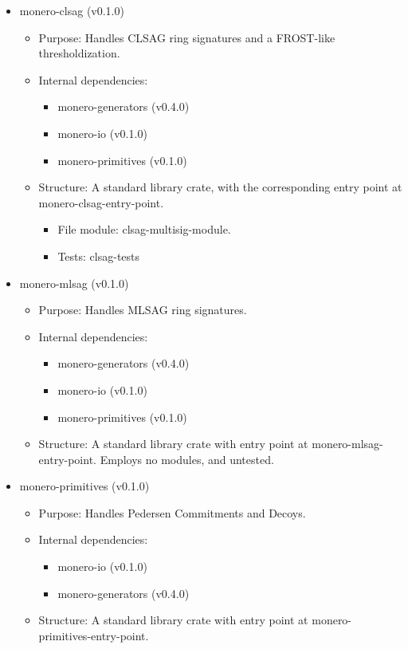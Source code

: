 \documentclass[12pt,a4paper]{article}
\begin{document}
\begin{itemize}
   \item \gls{monero-clsag (v0.1.0)}
   \begin{itemize}
   \item Purpose: Handles CLSAG ring signatures and a FROST-like thresholdization.
   \item Internal dependencies:
   \begin{itemize}
   \item \gls{monero-generators (v0.4.0)}
   \item \gls{monero-io (v0.1.0)}
   \item \gls{monero-primitives (v0.1.0)}
   \end{itemize}
   \item Structure: A standard library crate, with the corresponding entry point at \gls{monero-clsag-entry-point}.
   \begin{itemize}
   \item File module: \gls{clsag-multisig-module}.
   \item Tests: \gls{clsag-tests}
   \end{itemize}
   \end{itemize}

   \item \gls{monero-mlsag (v0.1.0)}
   \begin{itemize}
   \item Purpose: Handles MLSAG ring signatures.
   \item Internal dependencies:
   \begin{itemize}
   \item \gls{monero-generators (v0.4.0)}
   \item \gls{monero-io (v0.1.0)}
   \item \gls{monero-primitives (v0.1.0)}
   \end{itemize}
   \item Structure: A standard library crate with entry point at \gls{monero-mlsag-entry-point}. Employs no modules, and untested.
   \end{itemize}



 \item \gls{monero-primitives (v0.1.0)}
   \begin{itemize}
   \item Purpose: Handles Pedersen Commitments and Decoys.
   \item Internal dependencies:
   \begin{itemize}
   \item  \gls{monero-io (v0.1.0)}
   \item \gls{monero-generators (v0.4.0)}
   \end{itemize}
   \item Structure: A standard library crate with entry point at \gls{monero-primitives-entry-point}.
   \begin{itemize}


\end{itemize}
\end{itemize}
\end{itemize}
\end{document}

